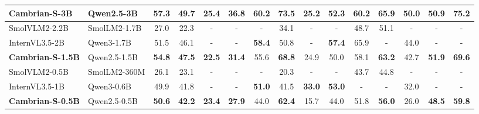 \documentclass[10pt]{article}
\begin{document}
\begin{center}
\begin{tabular}{@{}l|l|*{10}{c}|ccc@{}}
\rowcolor{selected}
\textbf{Cambrian-S-3B} & Qwen2.5-3B & \textbf{57.3} & \textbf{49.7} & \textbf{25.4} & \textbf{36.8} & 60.2 & \textbf{73.5} & \textbf{25.2} & 52.3 & \textbf{60.2} & 65.9 & \textbf{50.0} & \textbf{50.9} & \textbf{75.2} \\
\midrule
SmolVLM2-2.2B & SmolLM2-1.7B & 27.0 & 22.3 & - & - & - & 34.1 & - & - & 48.7 & 51.1 & - & - & - \\
InternVL3.5-2B & Qwen3-1.7B & 51.5 & 46.1 & - & - & \textbf{58.4} & 50.8 & - & \textbf{57.4} & 65.9 & - & 44.0 & - & - \\
\rowcolor{selected}
\textbf{Cambrian-S-1.5B} & Qwen2.5-1.5B & \textbf{54.8} & \textbf{47.5} & \textbf{22.5} & \textbf{31.4} & 55.6 & \textbf{68.8} & 24.9 & 50.0 & 58.1 & \textbf{63.2} & 42.7 & \textbf{51.9} & \textbf{69.6} \\
\midrule
SmolVLM2-0.5B & SmolLM2-360M & 26.1 & 23.1 & - & - & - & 20.3 & - & - & 43.7 & 44.8 & - & - & - \\
InternVL3.5-1B & Qwen3-0.6B & 49.9 & 41.8 & - & - & \textbf{51.0} & 41.5 & \textbf{33.0} & \textbf{53.0} & - & - & 32.0 & - & - \\
\rowcolor{selected}
\textbf{Cambrian-S-0.5B} & Qwen2.5-0.5B & \textbf{50.6} & \textbf{42.2} & \textbf{23.4} & \textbf{27.9} & 44.0 & \textbf{62.4} & 15.7 & 44.0 & 51.8 & \textbf{56.0} & 26.0 & \textbf{48.5} & \textbf{59.8} \\
\bottomrule\end{tabular}\end{center}
\end{document}
